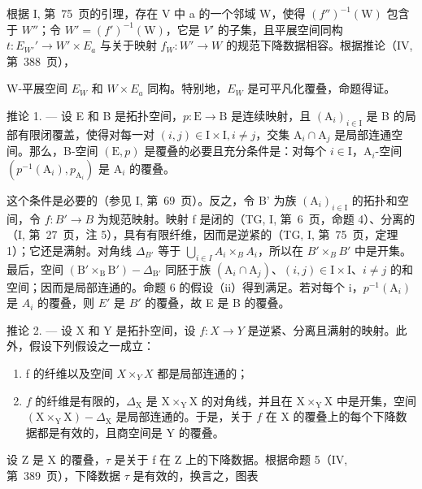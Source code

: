 根据 I, 第~75~页的引理，存在 V 中 a 的一个邻域 W，使得 \((f'')^{-1}(\mathrm{W})\) 包含于 \(W''\)；令 \(W'=(f')^{-1}(\mathrm{W})\)，它是 \(V'\) 的子集，且平展空间同构 \(t: E_{W'}' \to W' \times E_a\) 与关于映射 \(f_W: W' \to W\) 的规范下降数据相容。根据推论（IV, 第~388~页），

W-平展空间 \(E_{W}\) 和 \(W \times E_{a}\) 同构。特别地，\(E_{W}\) 是可平凡化覆叠，命题得证。

推论 1. --- 设 E 和 B 是拓扑空间，\(p\colon\mathrm{E}\to\mathrm{B}\) 是连续映射，且 \((\mathrm{A}_{i})_{i\in\mathrm{I}}\) 是 B 的局部有限闭覆盖，使得对每一对 \((i,j)\in\mathrm{I}\times\mathrm{I}, i\neq j\)，交集 \(\mathrm{A}_{i}\cap\mathrm{A}_{j}\) 是局部连通空间。那么，B-空间 \((\mathrm{E},p)\) 是覆叠的必要且充分条件是：对每个 \(i\in\mathrm{I}\)，\(\mathrm{A}_{i} \)-空间 \((p^{-1}(\mathrm{A}_{i}),p_{\mathrm{A}_{i}})\) 是 \(\mathrm{A}_{i}\) 的覆叠。

这个条件是必要的（参见 I, 第~69~页）。反之，令 B' 为族 \((\mathrm{A}_{i})_{i\in\mathrm{I}}\) 的拓扑和空间，令 \(f\colon B'\to B\) 为规范映射。映射 f 是闭的（TG, I, 第~6~页，命题 4）、分离的（I, 第~27~页，注 5），具有有限纤维，因而是逆紧的（TG, I, 第~75~页，定理 1）；它还是满射。对角线 \(\Delta_{B'}\) 等于 \(\bigcup_{i\in I}A_{i}\times_{B}A_{i}\)，所以在 \(B'\times_{B}B'\) 中是开集。最后，空间 \((\mathrm{B}'\times_{\mathrm{B}}\mathrm{B}')-\Delta_{\mathrm{B'}}\) 同胚于族 \((\mathrm{A}_{i}\cap\mathrm{A}_{j})\)、\((i,j)\in\mathrm{I}\times\mathrm{I}\)、\(i\neq j\) 的和空间；因而是局部连通的。命题 6 的假设（ii）得到满足。若对每个 i，\(p^{-1}(\mathrm{A}_{i})\) 是 \(A_{i}\) 的覆叠，则 \(E'\) 是 \(B'\) 的覆叠，故 E 是 B 的覆叠。

推论 2. --- 设 X 和 Y 是拓扑空间，设 \(f\colon X \to Y\) 是逆紧、分离且满射的映射。此外，假设下列假设之一成立：

\begin{enumerate}
\def\labelenumi{(\roman{enumi})}
\item
  f 的纤维以及空间 \(X\times_Y X\) 都是局部连通的；
\item
  \(f\) 的纤维是有限的，\(\Delta_{\mathrm{X}}\) 是 \(\mathrm{X} \times_{\mathrm{Y}} \mathrm{X}\) 的对角线，并且在 \(\mathrm{X} \times_{\mathrm{Y}} \mathrm{X}\) 中是开集，空间 \((\mathrm{X} \times_{\mathrm{Y}} \mathrm{X}) - \Delta_{\mathrm{X}}\) 是局部连通的。于是，关于 \(f\) 在 \(\mathrm{X}\) 的覆叠上的每个下降数据都是有效的，且商空间是 \(\mathrm{Y}\) 的覆叠。
\end{enumerate}

设 Z 是 X 的覆叠，\(\tau\) 是关于 f 在 Z 上的下降数据。根据命题 5（IV, 第~389~页），下降数据 \(\tau\) 是有效的，换言之，图表

